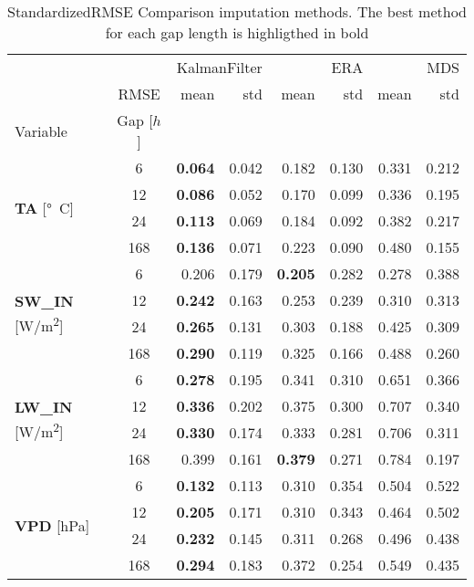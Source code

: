\begin{table}
\centering
\caption{StandardizedRMSE Comparison imputation methods. The best method for each gap length is highligthed in bold}
\label{the_table_stand}
\begin{tabular}{p{2.1cm}c|rr|rr|rr}
\toprule
 &  & \multicolumn{2}{r}{KalmanFilter} & \multicolumn{2}{r}{ERA} & \multicolumn{2}{r}{MDS} \\
 & RMSE & mean & std & mean & std & mean & std \\
Variable & Gap [$h$] &  &  &  &  &  &  \\
\midrule
\multirow[c]{4}{*}{\parbox{2.1cm}{\textbf{TA} [\si{°C}]}} & 6 & \bfseries 0.064 & 0.042 & 0.182 & 0.130 & 0.331 & 0.212 \\
 & 12 & \bfseries 0.086 & 0.052 & 0.170 & 0.099 & 0.336 & 0.195 \\
 & 24 & \bfseries 0.113 & 0.069 & 0.184 & 0.092 & 0.382 & 0.217 \\
 & 168 & \bfseries 0.136 & 0.071 & 0.223 & 0.090 & 0.480 & 0.155 \\
\cline{1-8}
\multirow[c]{4}{*}{\parbox{2.1cm}{\textbf{SW\_IN} [\si{W/m^2}]}} & 6 & 0.206 & 0.179 & \bfseries 0.205 & 0.282 & 0.278 & 0.388 \\
 & 12 & \bfseries 0.242 & 0.163 & 0.253 & 0.239 & 0.310 & 0.313 \\
 & 24 & \bfseries 0.265 & 0.131 & 0.303 & 0.188 & 0.425 & 0.309 \\
 & 168 & \bfseries 0.290 & 0.119 & 0.325 & 0.166 & 0.488 & 0.260 \\
\cline{1-8}
\multirow[c]{4}{*}{\parbox{2.1cm}{\textbf{LW\_IN} [\si{W/m^2}]}} & 6 & \bfseries 0.278 & 0.195 & 0.341 & 0.310 & 0.651 & 0.366 \\
 & 12 & \bfseries 0.336 & 0.202 & 0.375 & 0.300 & 0.707 & 0.340 \\
 & 24 & \bfseries 0.330 & 0.174 & 0.333 & 0.281 & 0.706 & 0.311 \\
 & 168 & 0.399 & 0.161 & \bfseries 0.379 & 0.271 & 0.784 & 0.197 \\
\cline{1-8}
\multirow[c]{4}{*}{\parbox{2.1cm}{\textbf{VPD} [\si{hPa}]}} & 6 & \bfseries 0.132 & 0.113 & 0.310 & 0.354 & 0.504 & 0.522 \\
 & 12 & \bfseries 0.205 & 0.171 & 0.310 & 0.343 & 0.464 & 0.502 \\
 & 24 & \bfseries 0.232 & 0.145 & 0.311 & 0.268 & 0.496 & 0.438 \\
 & 168 & \bfseries 0.294 & 0.183 & 0.372 & 0.254 & 0.549 & 0.435 \\
\cline{1-8}

\end{tabular}
\end{table}
